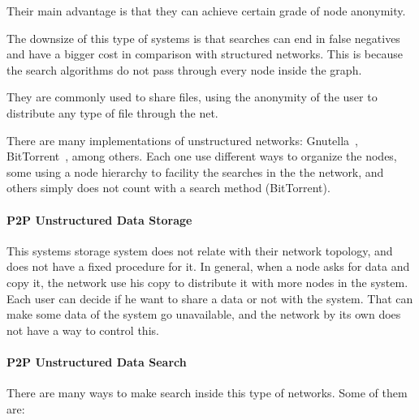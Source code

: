 Their main advantage is that they can achieve certain grade of node anonymity.

The downsize of this type of systems is that searches can end in false
negatives and have a bigger cost in comparison with structured networks. This
is because the search algorithms do not pass through every node inside the
graph.

They are commonly used to share files, using the anonymity of the user to
distribute any type of file through the net.

There are many implementations of unstructured networks:
Gnutella~\cite{oai:CiteSeerXPSU:10.1.1.61.7302}, 
BitTorrent~\cite{bittorrent}, 
among others. Each one use different ways to organize the nodes, some using a
node hierarchy to facility the searches in the the network, and others simply
does not count with a search method (BitTorrent).

\paragraph{P2P Unstructured Data Storage}
\label{sec:p2p_unstructured_storage}

This systems storage system does not relate with their network topology, and
does not have a fixed procedure for it. In general, when a node asks for data
and copy it, the network use his copy to distribute it with more nodes in the
system. Each user can decide if he want to share a data or not with the system.
That can make some data of the system go unavailable, and the network by its
own does not have a way to control this.


\paragraph{P2P Unstructured Data Search}
\label{sec:p2p_unstructured_search}

There are many ways to make search inside this type of networks. Some of them
are:

